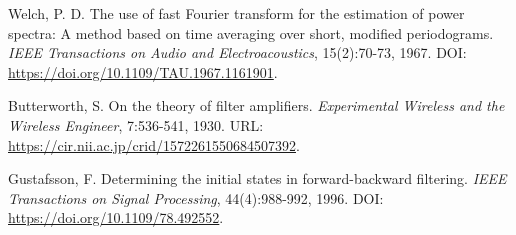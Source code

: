 \documentclass[UTF8,zihao=-4]{ctexart}
\begin{document}
\begin{enumerate}[label={[\arabic*]},leftmargin=2.6em,itemsep=0.2em]
  \item Welch, P. D. The use of fast Fourier transform for the estimation of power spectra: A method based on time averaging over short, modified periodograms. \textit{IEEE Transactions on Audio and Electroacoustics}, 15(2):70-73, 1967. DOI: \url{https://doi.org/10.1109/TAU.1967.1161901}.
  \item Butterworth, S. On the theory of filter amplifiers. \textit{Experimental Wireless and the Wireless Engineer}, 7:536-541, 1930. URL: \url{https://cir.nii.ac.jp/crid/1572261550684507392}.
  \item Gustafsson, F. Determining the initial states in forward-backward filtering. \textit{IEEE Transactions on Signal Processing}, 44(4):988-992, 1996. DOI: \url{https://doi.org/10.1109/78.492552}.
\end{enumerate}
\end{document}
